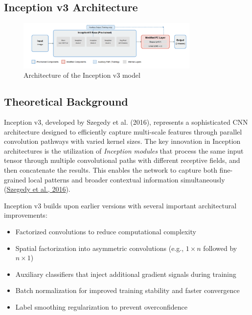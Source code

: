 \documentclass[a4paper,12pt]{report}
\begin{document}
\subsection{Inception v3 Architecture}

\begin{figure}[h]
    \centering
    \includegraphics[width=0.8\textwidth]{images/architecture/inception.png}
    \caption{Architecture of the Inception v3 model}
    \label{fig:inception_architecture}
\end{figure}

\subsection*{Theoretical Background}

Inception v3, developed by Szegedy et al. (2016), represents a sophisticated CNN architecture designed to efficiently capture multi-scale features through parallel convolution pathways with varied kernel sizes. The key innovation in Inception architectures is the utilization of \textit{Inception modules} that process the same input tensor through multiple convolutional paths with different receptive fields, and then concatenate the results. This enables the network to capture both fine-grained local patterns and broader contextual information simultaneously (\href{https://arxiv.org/abs/1512.00567}{Szegedy et al., 2016}).

Inception v3 builds upon earlier versions with several important architectural improvements:
\begin{itemize}
    \item Factorized convolutions to reduce computational complexity
    \item Spatial factorization into asymmetric convolutions (e.g., $1 \times n$ followed by $n \times 1$)
    \item Auxiliary classifiers that inject additional gradient signals during training
    \item Batch normalization for improved training stability and faster convergence
    \item Label smoothing regularization to prevent overconfidence
\end{itemize}
\end{document}
